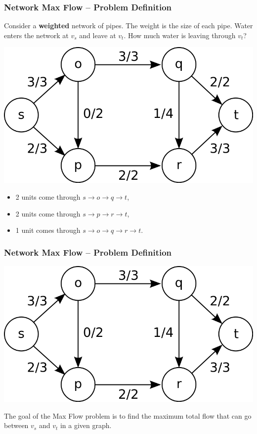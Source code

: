 \begin{frame}
  \frametitle{Network Max Flow -- Problem Definition}

  \begin{block}{}
    Consider a {\bf weighted} network of pipes. The weight is the size of each pipe. Water enters the network at $v_s$ and leave at $v_t$. How much water is leaving through $v_t$?
  \end{block}

  \begin{center}
    \includegraphics[width=.55\textwidth]{../img/maxflow_wiki}
  \end{center}

  \begin{itemize}
    \item 2 units come through $s\to o \to q \to t$,
    \item 2 units come through $s\to p\to r\to t$,
    \item 1 unit comes through $s\to o\to q\to r\to t$.
  \end{itemize}
\end{frame}

\begin{frame}
  \frametitle{Network Max Flow -- Problem Definition}
  \begin{center}
    \includegraphics[width=.55\textwidth]{../img/maxflow_wiki}
  \end{center}
  \bigskip

  The goal of the Max Flow problem is to find the maximum total flow that can go between $v_s$ and $v_t$ in a given graph.
\end{frame}


